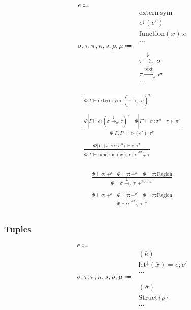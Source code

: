 \documentclass {article}
\begin{document}
\begin{align*}
e \Coloneqq & \\
& \text{extern} \, \text{sym} \tag{Extern Function} \\
& e ^\downarrow (e') \tag{Function Pointer Application} \\
& \text{function} (x). e \tag{Function Literal} \\
& \dots \\
\sigma, \tau, \pi, \kappa, s, \rho, \mu \Coloneqq & \\
& \tau \xrightarrow{\downarrow}_\pi \sigma \tag{Function Pointer}\\
& \tau \xrightarrow{\text{text}}_\pi \sigma  \tag{Function Literal Type} \\
& \dots
\end{align*}

\begin{gather*}
\frac
{}
{\Phi | \Gamma \vdash \text{extern} \, \text{sym} : (\tau \xrightarrow{\downarrow}_{\pi'} \sigma)^\pi} \\
\\
\frac
{\Phi | \Gamma \vdash e : (\sigma \xrightarrow{\downarrow}_{\pi'} \tau)^\pi \quad \Phi | \Gamma' \vdash e' : \sigma^\pi \quad \pi \succeq \pi'}
{\Phi | \Gamma, \Gamma' \vdash e^\downarrow (e') : \tau^\pi} \\
\\
\frac
{\Phi | \Gamma, \langle x : \forall \alpha. \sigma^\alpha \rangle \vdash e : \tau^\pi}
{\Phi | \Gamma \vdash \text{function}(x). e : \sigma \xrightarrow{\text{text}}_\pi \tau} \\
\end{gather*}

\begin{gather*}
\frac
{\Phi \vdash \sigma : +^{\rho} \quad \Phi \vdash \tau : +^{\rho'} \quad \Phi \vdash \pi : \text{Region}}
{\Phi \vdash \sigma \xrightarrow{\downarrow}_\pi \tau : +^{\text{Pointer}}} \\
\\
\frac
{\Phi \vdash \sigma : +^{\rho} \quad \Phi \vdash \tau : +^{\rho'} \quad \Phi \vdash \pi : \text{Region}}
{\Phi \vdash \sigma \xrightarrow{\text{text}}_\pi \tau : *} \\
\end{gather*}

\subsubsection{Tuples}
\begin{align*}
e \Coloneqq & \\
& (\overline e) \tag{Tuple Introduction} \\
& \text{let}^\downarrow (\overline x) = e; e' \tag{Tuple Elimination} \\
& \dots \\
\sigma, \tau, \pi, \kappa, s, \rho, \mu \Coloneqq & \\
& (\overline \sigma) \tag{Tuple} \\
& \text{Struct} \{ \overline \rho \} \tag{Struct Representation} \\
& \dots
\end{align*}
\end{document}
